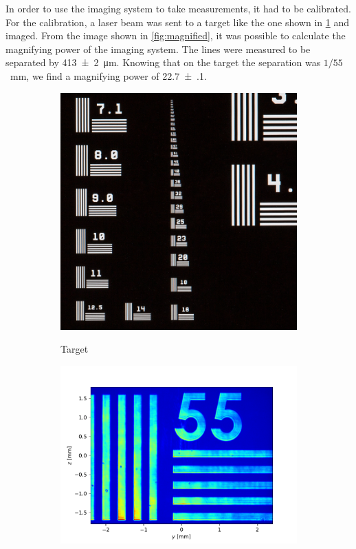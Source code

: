In order to use the imaging system to take measurements, it had to be calibrated. For the calibration, a laser beam was sent to a target like the one shown in \cref{fig:target} and imaged. From the image shown in \cref{fig:magnified}, it was possible to calculate the magnifying power of the imaging system. The lines were measured to be separated by \SI{413(2)}{\micro\meter}. Knowing that on the target the separation was $1/55$~mm, we find a magnifying power of \SI{22.7(1)}{}.

\begin{figure}
    \hfill
    \begin{subfigure}[b]{0.3 \textwidth}
        \includegraphics[width=\textwidth]{chapters/chapter_3/figures/target.jpg}
        \\
        \caption{Target}
        \label{fig:target}
    \end{subfigure}
    \hfill
    \begin{subfigure}[b]{0.55\textwidth}
        \includegraphics[width=\textwidth]{chapters/chapter_3/figures/magnified}

\end{subfigure}
\end{figure}
